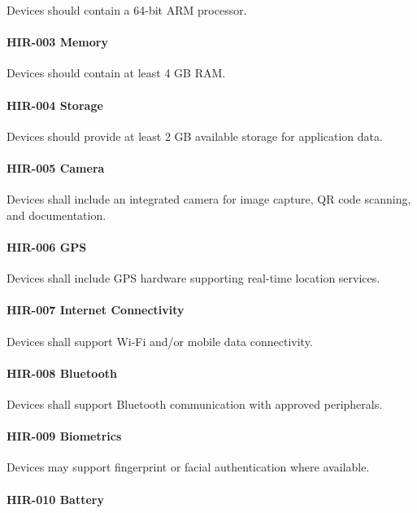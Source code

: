 Devices should contain a 64-bit ARM processor.

\paragraph{HIR-003 Memory}

Devices should contain at least 4 GB RAM.

\paragraph{HIR-004 Storage}

Devices should provide at least 2 GB available storage for application
data.

\paragraph{HIR-005 Camera}

Devices shall include an integrated camera for image capture, QR code
scanning, and documentation.

\paragraph{HIR-006 GPS}

Devices shall include GPS hardware supporting real-time location
services.

\paragraph{HIR-007 Internet Connectivity}

Devices shall support Wi-Fi and/or mobile data connectivity.

\paragraph{HIR-008 Bluetooth}

Devices shall support Bluetooth communication with approved peripherals.

\paragraph{HIR-009 Biometrics}

Devices may support fingerprint or facial authentication where
available.

\paragraph{HIR-010 Battery}


